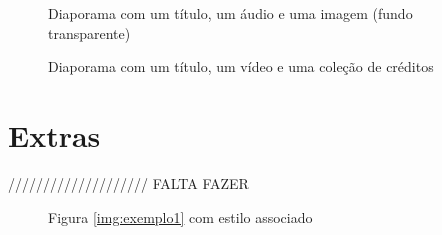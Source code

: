 \documentclass[11pt,a4paper]{report}
\begin{document}
\begin{figure}[H]
\centering
{}
\caption{Diaporama com um título, um áudio e uma imagem (fundo transparente)}
\label{img:exemplo5}
\end{figure}

\begin{figure}[H]
\centering
{}
\caption{Diaporama com um título, um vídeo e uma coleção de créditos}
\label{img:exemplo7}
\end{figure}


\chapter{Extras}
\label{chap:extras}

//////////////////// FALTA FAZER

\begin{figure}[H]
\centering
{}
\caption{Figura \ref{img:exemplo1} com estilo associado}
\label{img:exemplo2}
\end{figure}
\end{document}
